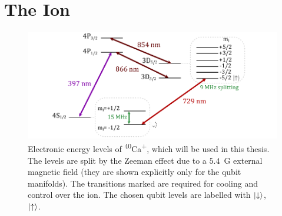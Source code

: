 \section{The Ion}
\label{sec:Transitions}
    \begin{figure}[ht]
        \begin{center}
        \noindent\includegraphics[width=\linewidth]{figures/pdf_figure/ion.pdf}
        \end{center}
        \caption{
        Electronic energy levels of \textsuperscript{40}Ca\textsuperscript{+},
        which will be used in this thesis. The levels are
        split by the Zeeman effect due to a $5.4$~G external magnetic field (they are shown explicitly only for the qubit manifolds). The
        transitions marked are required for cooling and control over the
        ion. The chosen qubit levels are labelled with $\ket{\downarrow}$, $\ket{\uparrow}$.
        }

    \label{fig:ion}
    \end{figure}

